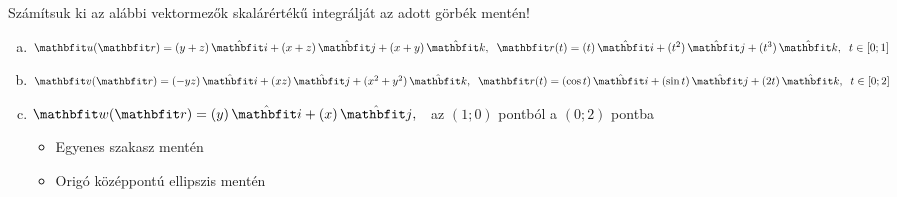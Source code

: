 \documentclass[exercise]{math-standalone}
\begin{document}
\begin{exercise}{Számítsuk ki az alábbi vektormezők skalárértékű integrálját az adott görbék mentén!}
  \begin{enumerate}[a)]
    \item $\rvec u(\rvec r) = \ijk{y + z}{x + z}{x + y}, \;\; \rvec r(t) = \ijk{t}{t^2}{t^3}, \;\; t \in [0; 1]$
    \item $\rvec v(\rvec r) = \ijk{-yz}{xz}{x^2 + y^2}, \;\; \rvec r(t) = \ijk{\cos t}{\sin t}{2t}, \;\; t \in [0; 2]$
    \item $\rvec w(\rvec r) = \ijz{y}{x}, \;\;$ az $(1;0)$ pontból a $(0;2)$ pontba
          \begin{multicols}{2}
            \begin{itemize}
              \item Egyenes szakasz mentén
              \item Origó középpontú ellipszis mentén
            \end{itemize}
          \end{multicols}
  \end{enumerate}

\end{exercise}
\end{document}
